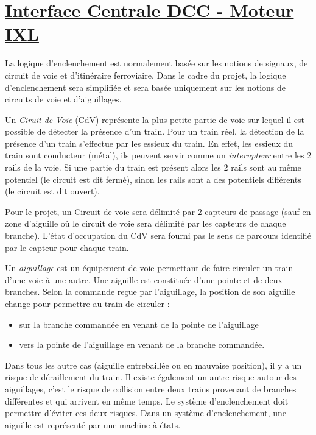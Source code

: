 \newpage
\section{\underline{Interface Centrale DCC - Moteur IXL}}
\label{sec:int_ixl}   

La logique d'enclenchement est normalement basée sur les notions de signaux, de
circuit de voie et d'itinéraire ferroviaire. Dans le cadre du projet,
la logique d'enclenchement sera simplifiée et sera basée uniquement sur les
notions de circuits de voie et d'aiguillages. 

\medskip
Un \emph{Ciruit de Voie} (CdV) représente la plus petite partie de
voie sur lequel il est possible de détecter la présence d'un
train. Pour un train réel, la détection de la présence d'un train
s'effectue par les essieux du train. En effet, les essieux du train
sont conducteur (métal), ils peuvent servir comme un
\emph{interupteur} entre les 2 rails de la voie. Si une partie du
train est présent alors les 2 rails sont au même potentiel (le circuit
est dit fermé), sinon les rails sont a des potentiels différents (le
circuit est dit ouvert).

\medskip
Pour le projet, un Circuit de voie sera délimité par 2 capteurs de
passage (sauf en zone d'aiguille où le circuit de voie sera délimité
par les capteurs de chaque branche). L'état d'occupation du CdV sera
fourni pas le sens de parcours identifié par le capteur pour chaque
train.

\medskip
Un \emph{aiguillage} est un équipement de voie permettant de faire
circuler un train d'une voie à une autre. Une aiguille est constituée
d'une pointe et de deux branches. Selon la commande reçue par
l'aiguillage, la position de son aiguille change pour permettre au train
de circuler :
\begin{itemize}
\item sur la branche commandée en venant de la pointe de l'aiguillage
\item vers la pointe de l'aiguillage en venant de la branche commandée.
\end{itemize}

\medskip
Dans tous les autre cas (aiguille entrebaillée ou en mauvaise position), 
il y a un risque de déraillement du train. Il existe également un autre 
risque autour des aiguillages, c'est le risque de collision entre deux
trains provenant de branches différentes et qui arrivent en même temps. Le système
d'enclenchement doit permettre d'éviter ces deux risques.
Dans un système d'enclenchement, une aiguille est représenté par une 
machine à états.

